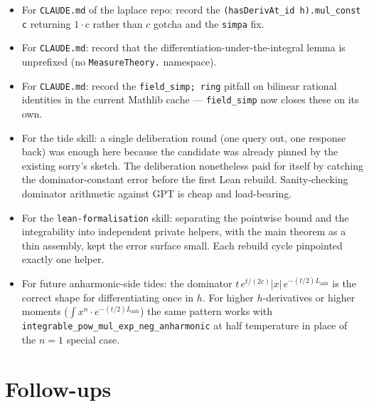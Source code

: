 \documentclass[11pt]{article}
\begin{document}
\begin{itemize}[itemsep=2pt]
  \item For \texttt{CLAUDE.md} of the laplace repo: record the
    \texttt{(hasDerivAt\_id h).mul\_const c} returning \(1 \cdot c\)
    rather than \(c\) gotcha and the \texttt{simpa} fix.

  \item For \texttt{CLAUDE.md}: record that the
    differentiation-under-the-integral lemma is unprefixed (no
    \texttt{MeasureTheory.} namespace).

  \item For \texttt{CLAUDE.md}: record the
    \texttt{field\_simp; ring} pitfall on bilinear rational identities
    in the current Mathlib cache --- \texttt{field\_simp} now closes
    these on its own.

  \item For the tide skill: a single deliberation round (one query
    out, one response back) was enough here because the candidate was
    already pinned by the existing sorry's sketch. The deliberation
    nonetheless paid for itself by catching the dominator-constant
    error before the first Lean rebuild. Sanity-checking dominator
    arithmetic against GPT is cheap and load-bearing.

  \item For the \texttt{lean-formalisation} skill: separating the
    pointwise bound and the integrability into independent private
    helpers, with the main theorem as a thin assembly, kept the
    error surface small. Each rebuild cycle pinpointed exactly one
    helper.

  \item For future anharmonic-side tides: the dominator
    \(t \, e^{t/(2c)} |x| \, e^{-(t/2) L_{\mathrm{anh}}}\) is the
    correct shape for differentiating once in \(h\). For higher
    \(h\)-derivatives or higher moments
    (\(\int x^n \cdot e^{-(t/2)L_{\mathrm{anh}}}\)) the same pattern
    works with \texttt{integrable\_pow\_mul\_exp\_neg\_anharmonic} at
    half temperature in place of the \(n=1\) special case.
\end{itemize}

\section{Follow-ups}
\end{document}
